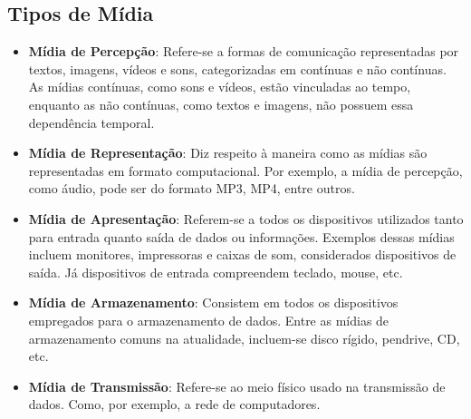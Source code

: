\documentclass[12pt]{article}
\begin{document}
	\subsection{Tipos de Mídia}
	\begin{itemize}
		\item \textbf{Mídia de Percepção}: Refere-se a formas de comunicação representadas por textos, imagens, vídeos e sons, categorizadas em contínuas e não contínuas. As mídias contínuas, como sons e vídeos, estão vinculadas ao tempo, enquanto as não contínuas, como textos e imagens, não possuem essa dependência temporal.
		
		\item \textbf{Mídia de Representação}: Diz respeito à maneira como as mídias são representadas em formato computacional. Por exemplo, a mídia de percepção, como áudio, pode ser do formato MP3, MP4, entre outros.
		
		\item \textbf{Mídia de Apresentação}: Referem-se a todos os dispositivos utilizados tanto para entrada quanto saída de dados ou informações. Exemplos dessas mídias incluem monitores, impressoras e caixas de som, considerados dispositivos de saída. Já dispositivos de entrada compreendem teclado, mouse, etc.
		
		\item \textbf{Mídia de Armazenamento}: Consistem em todos os dispositivos empregados para o armazenamento de dados. Entre as mídias de armazenamento comuns na atualidade, incluem-se disco rígido, pendrive, CD, etc.
		
		\item \textbf{Mídia de Transmissão}: Refere-se ao meio físico usado na transmissão de
		dados. Como, por exemplo, a rede de computadores.
	\end{itemize}
	
	
\end{document}
